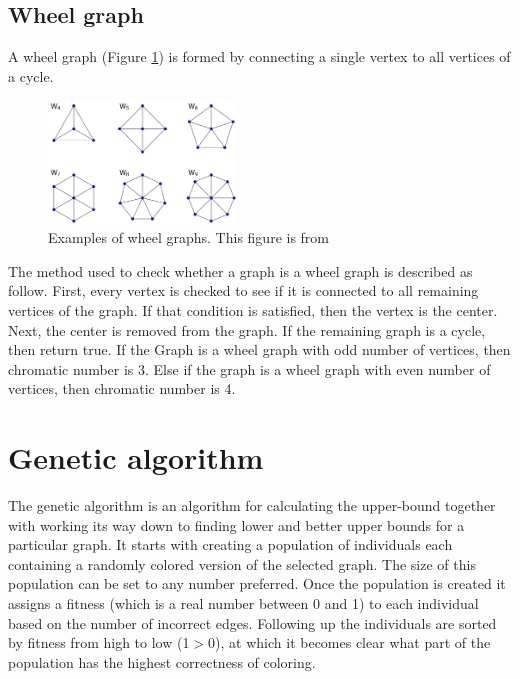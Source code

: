 \documentclass[a4paper]{report}
\begin{document}
			\subsection{Wheel graph}
			A wheel graph (Figure \ref{fig:wheel}) is formed by connecting a single vertex to all vertices of a cycle.
		
			\begin{figure}[h]
				\centering
				\includegraphics[width=50mm,scale=0.5]{figures/wheel.png}
				\caption{Examples of wheel graphs. This figure is from \protect\cite{wheelFig}}
				\label{fig:wheel}
			\end{figure}
			
			The method used to check whether a graph is a wheel graph is described as follow. First, every vertex is checked to see if it is connected to all remaining vertices of the graph. If that condition is satisfied, then the vertex is the center. Next, the center is removed from the graph. If the remaining graph is a cycle, then return true.
			If the Graph is a wheel graph with odd number of vertices, then chromatic number is 3.
			Else if the graph is a wheel graph with even number of vertices, then chromatic number is 4.
			
			
		\section{Genetic algorithm}
		The genetic algorithm is an algorithm for calculating the upper-bound together with working its way down to finding lower and better upper bounds for a particular graph. It starts with creating a population of individuals each containing a randomly colored version of the selected graph. The size of this population can be set to any number preferred. Once the population is created it assigns a fitness (which is a real number between 0 and 1) to each individual based on the number of incorrect edges. Following up the individuals are sorted by fitness from high to low (1$>$0), at which it becomes clear what part of the population has the highest correctness of coloring.\\
		
\end{document}
